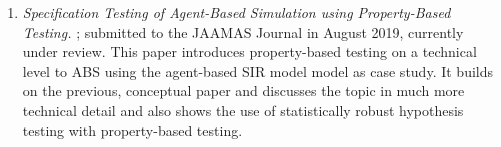 \begin{enumerate}
	\item \textit{Specification Testing of Agent-Based Simulation using Property-Based Testing.} \cite{thaler_specification_2019}; submitted to the JAAMAS Journal in August 2019, currently under review.
This paper introduces property-based testing on a technical level to ABS using the agent-based SIR model model as case study. It builds on the previous, conceptual paper and discusses the topic in much more technical detail and also shows the use of statistically robust hypothesis testing with property-based testing. %
\end{enumerate}
